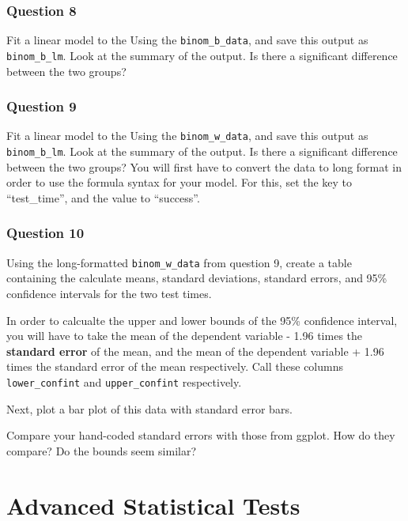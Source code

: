 \documentclass[
]{book}
\begin{document}
\hypertarget{question-8-5}{%
\subsection{Question 8}\label{question-8-5}}

Fit a linear model to the Using the \texttt{binom\_b\_data}, and save this output as \texttt{binom\_b\_lm}. Look at the summary of the output. Is there a significant difference between the two groups?

\hypertarget{question-9-5}{%
\subsection{Question 9}\label{question-9-5}}

Fit a linear model to the Using the \texttt{binom\_w\_data}, and save this output as \texttt{binom\_b\_lm}. Look at the summary of the output. Is there a significant difference between the two groups? You will first have to convert the data to long format in order to use the formula syntax for your model. For this, set the key to ``test\_time'', and the value to ``success''.

\hypertarget{question-10-4}{%
\subsection{Question 10}\label{question-10-4}}

Using the long-formatted \texttt{binom\_w\_data} from question 9, create a table containing the calculate means, standard deviations, standard errors, and 95\% confidence intervals for the two test times.

In order to calcualte the upper and lower bounds of the 95\% confidence interval, you will have to take the mean of the dependent variable - 1.96 times the \textbf{standard error} of the mean, and the mean of the dependent variable + 1.96 times the standard error of the mean respectively. Call these columns \texttt{lower\_confint} and \texttt{upper\_confint} respectively.

Next, plot a bar plot of this data with standard error bars.

Compare your hand-coded standard errors with those from ggplot. How do they compare? Do the bounds seem similar?

\hypertarget{advanced-statistical-tests}{%
\chapter{Advanced Statistical Tests}\label{advanced-statistical-tests}}
\end{document}
